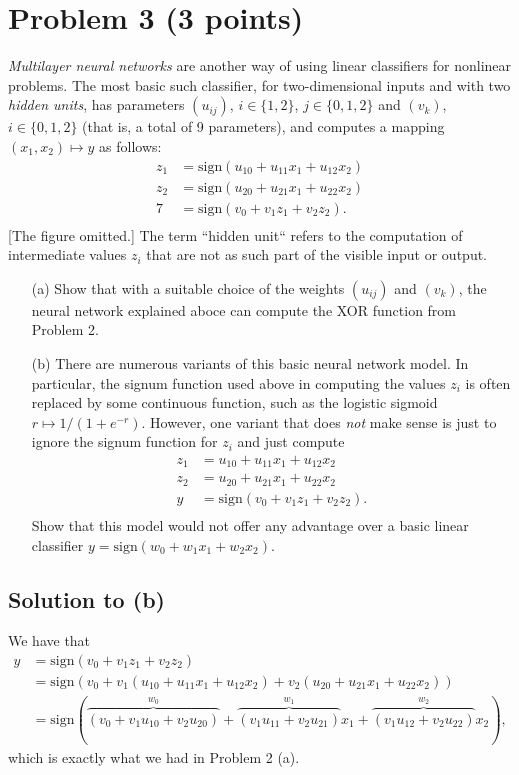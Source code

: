 \documentclass[10pt]{article}
\begin{document}
\section*{Problem 3 (3 points)}
\color{blue}
\textit{Multilayer neural networks} are another way of using linear classifiers for nonlinear problems. The most basic such classifier, for two-dimensional inputs and with two \textit{hidden units}, has parameters $(u_{ij})$, $i \in \{ 1, 2 \}$, $j \in \{ 0, 1, 2 \}$ and $(v_k)$, $i \in \{ 0, 1, 2 \}$ (that is, a total of 9 parameters), and computes a mapping $(x_1, x_2) \mapsto y$ as follows:
\begin{align*}
z_1 &= \text{sign}(u_{10} + u_{11} x_1 + u_{12} x_2) \\
z_2 &= \text{sign}(u_{20} + u_{21} x_1 + u_{22} x_2) \\
7 &= \text{sign}(v_0 + v_1 z_1 + v_2 z_2). \\
\end{align*}
[The figure omitted.]
The term ``hidden unit`` refers to the computation of intermediate values $z_i$ that are not as such part of the visible input or output.
\begin{itemize}
\item[(a)] Show that with a suitable choice of the weights $(u_{ij})$ and $(v_k)$, the neural network explained aboce can compute the XOR function from Problem 2.
\item[(b)] There are numerous variants of this basic neural network model. In particular, the signum function used above in computing the values $z_i$ is often replaced by some continuous function, such as the logistic sigmoid $r \mapsto 1/(1 + e^{-r})$. However, one variant that does \textit{not} make sense is just to ignore the signum function for $z_i$ and just compute
\begin{align*}
z_1 &= u_{10} + u_{11} x_1 + u_{12} x_2 \\
z_2 &= u_{20} + u_{21} x_1 + u_{22} x_2 \\
y   &= \text{sign}(v_0 + v_1 z_1 + v_2 z_2). \\
\end{align*}
Show that this model would not offer any advantage over a basic linear classifier $y = \text{sign}(w_0 + w_1 x_1 + w_2 x_2).$
\end{itemize}
\color{black}

\subsection*{Solution to (b)}
We have that 
\begin{align*}
y &= \text{sign}(v_0 + v_1 z_1 + v_2 z_2) \\
  &= \text{sign}(v_0 + v_1 (u_{10} + u_{11}x_1 + u_{12}x_2) + v_2 (u_{20} + u_{21}x_1 + u_{22}x_2)) \\
  &= \text{sign}(\overbrace{(v_0 + v_1 u_{10} + v_2 u_{20})}^{w_0} + \overbrace{(v_1 u_{11} + v_2 u_{21})}^{w_1} x_1 + \overbrace{(v_1 u_{12} + v_2 u_{22})}^{w_2} x_2),
\end{align*}
which is exactly what we had in Problem 2 (a).
\end{document}
